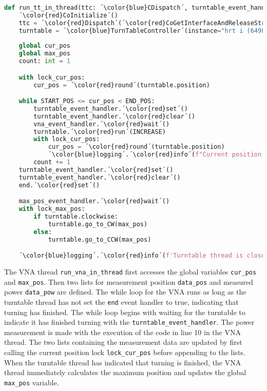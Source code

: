 \begin{lstlisting}[language=Python, caption=Thread function for running VNA.]
def run_tt_in_thread(ttc: ´\color{blue}CDispatch´, turntable_event_handler: ´\color{blue}Event´, vna_event_handler: ´\color{blue}Event´, end: ´\color{blue}Event´, ttc_id) -> None:
    ´\color{red}CoInitialize´()
    ttc = ´\color{red}Dispatch´(´\color{red}CoGetInterfaceAndReleaseStream´(ttc_id, IID_IDispatch))
    turntable = ´\color{blue}TurnTableController´(instance="hrt i (64980128)", ttc=ttc, clockwise=True, start_pos=START_POS)
    
    global cur_pos
    global max_pos
    count: int = 1

    with lock_cur_pos:
        cur_pos = ´\color{red}round´(turntable.position)

    while START_POS <= cur_pos < END_POS:
        turntable_event_handler.´\color{red}set´()
        turntable_event_handler.´\color{red}clear´()
        vna_event_handler.´\color{red}wait´()
        turntable.´\color{red}run´(INCREASE)
        with lock_cur_pos:
            cur_pos = ´\color{red}round´(turntable.position) 
            ´\color{blue}logging´.´\color{red}info´(f"Current position for {turntable.instance} is {cur_pos}.")
        count += 1
    turntable_event_handler.´\color{red}set´()
    turntable_event_handler.´\color{red}clear´()
    end.´\color{red}set´()

    max_pos_event_handler.´\color{red}wait´()
    with lock_max_pos:
        if turntable.clockwise:
            turntable.go_to_CW(max_pos)
        else:
            turntable.go_to_CCW(max_pos)

    ´\color{blue}logging´.´\color{red}info´(f'Turntable thread is closed. {count} positions measured.')
\end{lstlisting}

The VNA thread \verb+run_vna_in_thread+ first accesses the global variables \verb+cur_pos+ and \verb+max_pos+. Then two lists for measurement position \verb+data_pos+ and measured power \verb+data_pow+ are defined. The while loop for the VNA runs as long as the turntable thread has not set the \verb+end+ event handler to true, indicating that turning has finished. The while loop begins with waiting for the turntable to indicate it has finished turning with the \verb+turntable_event_handler+. The power measurement is made with the execution of the code in line 10 in the VNA thread. The two lists containing the measurement data are updated by first calling the current position lock \verb+lock_cur_pos+ before appending to the lists. When the turntable thread has indicated that turning is finished, the VNA thread immediately calculates the maximum position and updates the global \verb+max_pos+ variable.

